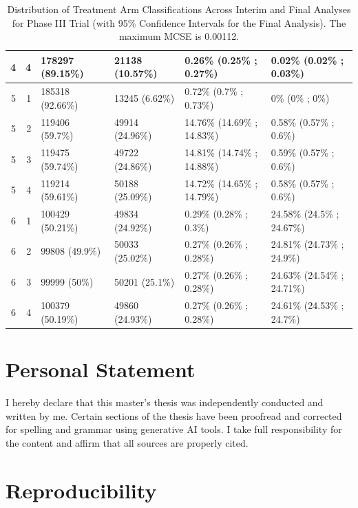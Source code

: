 \documentclass[11pt, a4paper]{article}\usepackage[]{graphicx}\usepackage[]{xcolor}
\begin{document}
{\begin{landscape}
\begin{table}[ht]
\begin{tabular}{rrllll}
    4 &   4 & 178297 (89.15\%) & 21138 (10.57\%) & 0.26\% (0.25\% ; 0.27\%) & 0.02\% (0.02\% ; 0.03\%) \\ 
   \hline 
  5 &   1 & 185318 (92.66\%) & 13245 (6.62\%) & 0.72\% (0.7\% ; 0.73\%) & 0\% (0\% ; 0\%) \\ 
    5 &   2 & 119406 (59.7\%) & 49914 (24.96\%) & 14.76\% (14.69\% ; 14.83\%) & 0.58\% (0.57\% ; 0.6\%) \\ 
    5 &   3 & 119475 (59.74\%) & 49722 (24.86\%) & 14.81\% (14.74\% ; 14.88\%) & 0.59\% (0.57\% ; 0.6\%) \\ 
    5 &   4 & 119214 (59.61\%) & 50188 (25.09\%) & 14.72\% (14.65\% ; 14.79\%) & 0.58\% (0.57\% ; 0.6\%) \\ 
   \hline 
  6 &   1 & 100429 (50.21\%) & 49834 (24.92\%) & 0.29\% (0.28\% ; 0.3\%) & 24.58\% (24.5\% ; 24.67\%) \\ 
    6 &   2 & 99808 (49.9\%) & 50033 (25.02\%) & 0.27\% (0.26\% ; 0.28\%) & 24.81\% (24.73\% ; 24.9\%) \\ 
    6 &   3 & 99999 (50\%) & 50201 (25.1\%) & 0.27\% (0.26\% ; 0.28\%) & 24.63\% (24.54\% ; 24.71\%) \\ 
    6 &   4 & 100379 (50.19\%) & 49860 (24.93\%) & 0.27\% (0.26\% ; 0.28\%) & 24.61\% (24.53\% ; 24.7\%) \\ 
   \hline 
 \hline
\end{tabular}
\caption{Distribution of Treatment Arm Classifications Across Interim and Final Analyses for Phase III Trial (with 95\% Confidence Intervals for the Final Analysis). The maximum MCSE is 0.00112.} 
\label{tab:outcome_distribution_phase3_appendix}
\end{table}

\end{landscape}



\section{Personal Statement} \label{sec:statment}

I hereby declare that this master's thesis was independently conducted and written by me. Certain sections of the thesis have been proofread and corrected for spelling and grammar using generative AI tools. I take full responsibility for the content and affirm that all sources are properly cited.

\section{Reproducibility} \label{sec:app_reproducibility}

}
\end{document}
